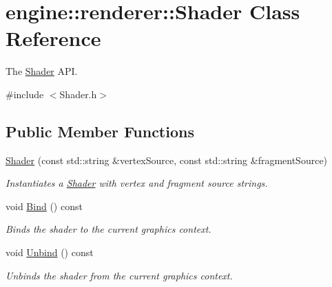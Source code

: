 \hypertarget{classengine_1_1renderer_1_1Shader}{}\section{engine\+:\+:renderer\+:\+:Shader Class Reference}
\label{classengine_1_1renderer_1_1Shader}


The \hyperlink{classengine_1_1renderer_1_1Shader}{Shader} A\+PI.  




{\ttfamily \#include $<$Shader.\+h$>$}

\subsection*{Public Member Functions}
\begin{DoxyCompactItemize}
\item 
\hyperlink{classengine_1_1renderer_1_1Shader_a48fb2f9ae7b37051093275c2ecbbae9e}{Shader} (const std\+::string \&vertex\+Source, const std\+::string \&fragment\+Source)
\begin{DoxyCompactList}\small\item\em Instantiates a \hyperlink{classengine_1_1renderer_1_1Shader}{Shader} with vertex and fragment source strings. \end{DoxyCompactList}\item 
\mbox{\label{classengine_1_1renderer_1_1Shader_a44e090922cee0b54525dee744a4896ba}} 
void \hyperlink{classengine_1_1renderer_1_1Shader_a44e090922cee0b54525dee744a4896ba}{Bind} () const
\begin{DoxyCompactList}\small\item\em Binds the shader to the current graphics context. \end{DoxyCompactList}\item 
\mbox{\label{classengine_1_1renderer_1_1Shader_a9dad03ff8a12cebea905b507e4e58833}} 
void \hyperlink{classengine_1_1renderer_1_1Shader_a9dad03ff8a12cebea905b507e4e58833}{Unbind} () const
\begin{DoxyCompactList}\small\item\em Unbinds the shader from the current graphics context. \end{DoxyCompactList}\end{DoxyCompactItemize}


